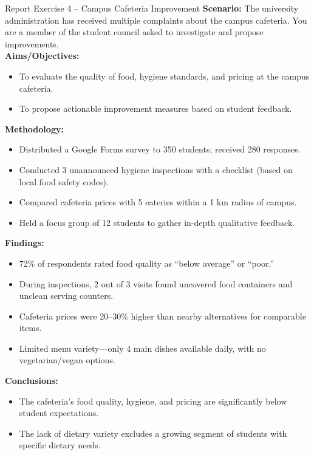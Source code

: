 \documentclass[12pt,a4paper]{article}
\begin{document}
\begin{exbox}{Report Exercise 4 -- Campus Cafeteria Improvement}
\textbf{Scenario:} The university administration has received multiple complaints about the campus cafeteria. You are a member of the student council asked to investigate and propose improvements.\\[0.3cm]

\textbf{Aims/Objectives:}
\begin{itemize}[noitemsep]
    \item To evaluate the quality of food, hygiene standards, and pricing at the campus cafeteria.
    \item To propose actionable improvement measures based on student feedback.
\end{itemize}

\textbf{Methodology:}
\begin{itemize}[noitemsep]
    \item Distributed a Google Forms survey to 350 students; received 280 responses.
    \item Conducted 3 unannounced hygiene inspections with a checklist (based on local food safety codes).
    \item Compared cafeteria prices with 5 eateries within a 1 km radius of campus.
    \item Held a focus group of 12 students to gather in-depth qualitative feedback.
\end{itemize}

\textbf{Findings:}
\begin{itemize}[noitemsep]
    \item 72\% of respondents rated food quality as ``below average'' or ``poor.''
    \item During inspections, 2 out of 3 visits found uncovered food containers and unclean serving counters.
    \item Cafeteria prices were 20--30\% higher than nearby alternatives for comparable items.
    \item Limited menu variety---only 4 main dishes available daily, with no vegetarian/vegan options.
\end{itemize}

\textbf{Conclusions:}
\begin{itemize}[noitemsep]
    \item The cafeteria's food quality, hygiene, and pricing are significantly below student expectations.
    \item The lack of dietary variety excludes a growing segment of students with specific dietary needs.
\end{itemize}


\end{exbox}
\end{document}
